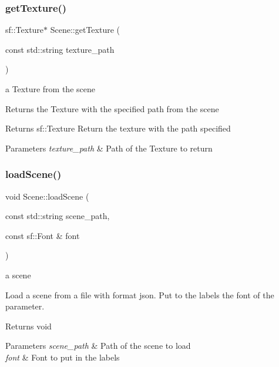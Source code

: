 \subsubsection{\texorpdfstring{get\+Texture()}{getTexture()}}
{\footnotesize\ttfamily sf\+::\+Texture$\ast$ Scene\+::get\+Texture (\begin{DoxyParamCaption}\item[{const std\+::string}]{texture\+\_\+path }\end{DoxyParamCaption})}

a Texture from the scene

Returns the Texture with the specified path from the scene

\begin{DoxyReturn}{Returns}
sf\+::\+Texture Return the texture with the path specified 
\end{DoxyReturn}

\begin{DoxyParams}{Parameters}
{\em texture\+\_\+path} & Path of the Texture to return \\
\hline
\end{DoxyParams}
\mbox{\label{class_scene_aca9bd4059c420909135294125b591682}} 
\subsubsection{\texorpdfstring{load\+Scene()}{loadScene()}}
{\footnotesize\ttfamily void Scene\+::load\+Scene (\begin{DoxyParamCaption}\item[{const std\+::string}]{scene\+\_\+path,  }\item[{const sf\+::\+Font \&}]{font }\end{DoxyParamCaption})}

a scene

Load a scene from a file with format json. Put to the labels the font of the parameter.

\begin{DoxyReturn}{Returns}
void 
\end{DoxyReturn}

\begin{DoxyParams}{Parameters}
{\em scene\+\_\+path} & Path of the scene to load \\
\hline
{\em font} & Font to put in the labels \\
\hline
\end{DoxyParams}
\mbox{\label{class_scene_a33e4cfa3d8433c5ccb8842ca65d85c70}} 
